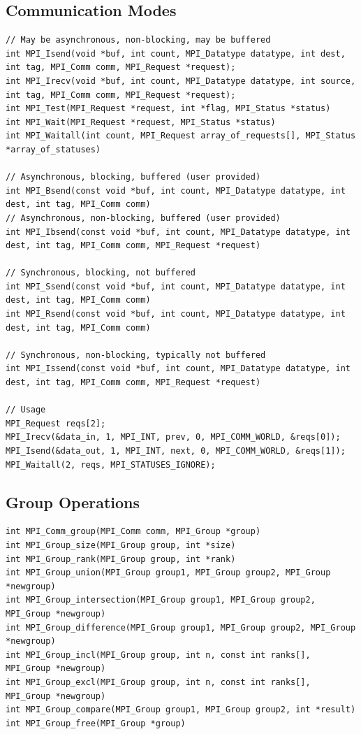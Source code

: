 \documentclass{article}
\begin{document}
\subsection{Communication Modes}
\begin{lstlisting}
// May be asynchronous, non-blocking, may be buffered
int MPI_Isend(void *buf, int count, MPI_Datatype datatype, int dest, int tag, MPI_Comm comm, MPI_Request *request);
int MPI_Irecv(void *buf, int count, MPI_Datatype datatype, int source, int tag, MPI_Comm comm, MPI_Request *request);
int MPI_Test(MPI_Request *request, int *flag, MPI_Status *status)
int MPI_Wait(MPI_Request *request, MPI_Status *status)
int MPI_Waitall(int count, MPI_Request array_of_requests[], MPI_Status *array_of_statuses)

// Asynchronous, blocking, buffered (user provided)
int MPI_Bsend(const void *buf, int count, MPI_Datatype datatype, int dest, int tag, MPI_Comm comm)
// Asynchronous, non-blocking, buffered (user provided)
int MPI_Ibsend(const void *buf, int count, MPI_Datatype datatype, int dest, int tag, MPI_Comm comm, MPI_Request *request)

// Synchronous, blocking, not buffered
int MPI_Ssend(const void *buf, int count, MPI_Datatype datatype, int dest, int tag, MPI_Comm comm)
int MPI_Rsend(const void *buf, int count, MPI_Datatype datatype, int dest, int tag, MPI_Comm comm)

// Synchronous, non-blocking, typically not buffered
int MPI_Issend(const void *buf, int count, MPI_Datatype datatype, int dest, int tag, MPI_Comm comm, MPI_Request *request)

// Usage
MPI_Request reqs[2];
MPI_Irecv(&data_in, 1, MPI_INT, prev, 0, MPI_COMM_WORLD, &reqs[0]);
MPI_Isend(&data_out, 1, MPI_INT, next, 0, MPI_COMM_WORLD, &reqs[1]);
MPI_Waitall(2, reqs, MPI_STATUSES_IGNORE);
\end{lstlisting}

\subsection{Group Operations}
\begin{lstlisting}
int MPI_Comm_group(MPI_Comm comm, MPI_Group *group)
int MPI_Group_size(MPI_Group group, int *size)
int MPI_Group_rank(MPI_Group group, int *rank)
int MPI_Group_union(MPI_Group group1, MPI_Group group2, MPI_Group *newgroup)
int MPI_Group_intersection(MPI_Group group1, MPI_Group group2, MPI_Group *newgroup)
int MPI_Group_difference(MPI_Group group1, MPI_Group group2, MPI_Group *newgroup)
int MPI_Group_incl(MPI_Group group, int n, const int ranks[], MPI_Group *newgroup)
int MPI_Group_excl(MPI_Group group, int n, const int ranks[], MPI_Group *newgroup)
int MPI_Group_compare(MPI_Group group1, MPI_Group group2, int *result)
int MPI_Group_free(MPI_Group *group)    
\end{lstlisting}
\end{document}
